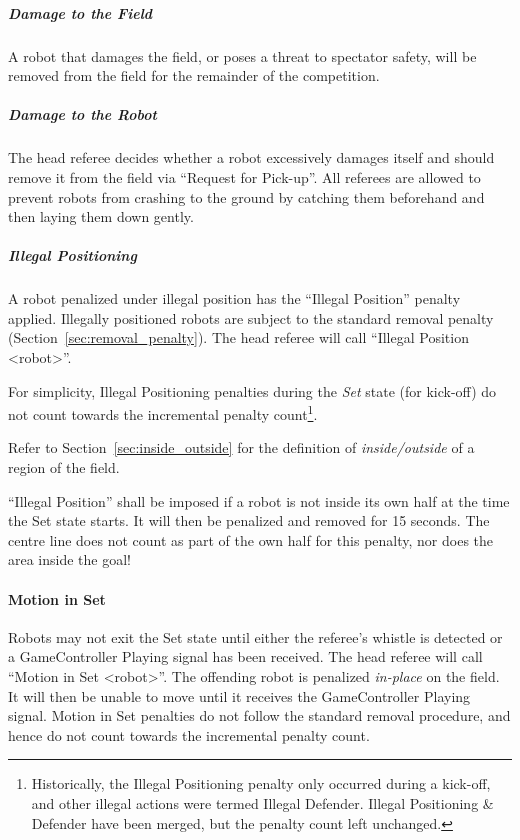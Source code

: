 \subparagraph{Damage to the Field}
\label{sec:damage}

A robot that damages the field, or poses a threat to spectator safety, will be removed from the field for the remainder of the competition.

\subparagraph{Damage to the Robot}
\label{sec:damage_robot}

The head referee decides whether a robot excessively damages itself and should remove it from the field via ``Request for Pick-up''. 
All referees are allowed to prevent robots from crashing to the ground by catching them beforehand and then laying them down gently.

\subparagraph{Illegal Positioning}
\label{sec:illegal_positioning}

A robot penalized under illegal position has the ``Illegal Position'' penalty applied. Illegally positioned robots are subject to the standard removal penalty (\cf Section~\ref{sec:removal_penalty}).
The head referee will call ``Illegal Position  \textless robot\textgreater''.

For simplicity, Illegal Positioning penalties during the \textit{Set} state (for kick-off) do not count towards the incremental penalty count\footnote{Historically, the Illegal Positioning penalty only occurred during a kick-off, and other illegal actions were termed Illegal Defender. Illegal Positioning \& Defender have been merged, but the penalty count left unchanged.}.

Refer to Section~\ref{sec:inside_outside} for the definition of \textit{inside/outside} of a region of the field.

``Illegal Position'' shall be imposed if a robot is not inside its own half at the time the Set state starts. It will then be penalized and removed for 15 seconds. The centre line does not count as part of the own half for this penalty, nor does the area inside the goal!

\paragraph{Motion in Set}
\label{sec:motion_in_set}

Robots may not exit the Set state until either the referee's whistle is detected or a GameController Playing signal has been received.
The head referee will call ``Motion in Set \textless robot\textgreater''.
The offending robot is penalized \textit{in-place} on the field. It will then be unable to move until it receives the GameController Playing signal. Motion in Set penalties do not follow the standard removal procedure, and hence do not count towards the incremental penalty count.

